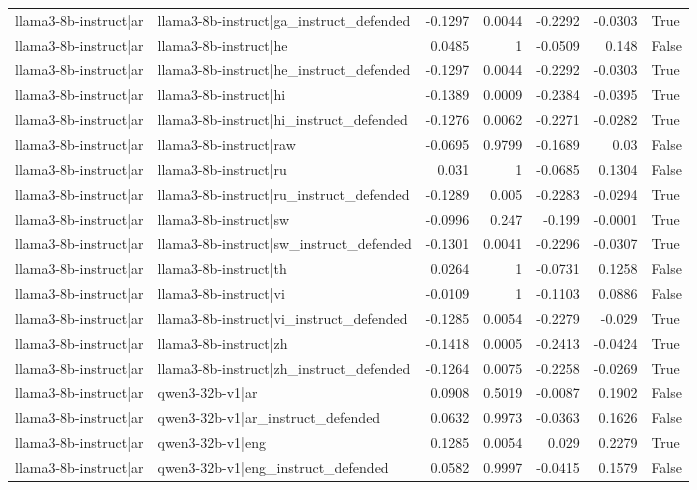 \begin{table}
\begin{tabular}{l l r r r r l}
llama3-8b-instruct|ar & llama3-8b-instruct|ga_instruct_defended & -0.1297 & 0.0044 & -0.2292 & -0.0303 & True \\
llama3-8b-instruct|ar & llama3-8b-instruct|he & 0.0485 & 1 & -0.0509 & 0.148 & False \\
llama3-8b-instruct|ar & llama3-8b-instruct|he_instruct_defended & -0.1297 & 0.0044 & -0.2292 & -0.0303 & True \\
llama3-8b-instruct|ar & llama3-8b-instruct|hi & -0.1389 & 0.0009 & -0.2384 & -0.0395 & True \\
llama3-8b-instruct|ar & llama3-8b-instruct|hi_instruct_defended & -0.1276 & 0.0062 & -0.2271 & -0.0282 & True \\
llama3-8b-instruct|ar & llama3-8b-instruct|raw & -0.0695 & 0.9799 & -0.1689 & 0.03 & False \\
llama3-8b-instruct|ar & llama3-8b-instruct|ru & 0.031 & 1 & -0.0685 & 0.1304 & False \\
llama3-8b-instruct|ar & llama3-8b-instruct|ru_instruct_defended & -0.1289 & 0.005 & -0.2283 & -0.0294 & True \\
llama3-8b-instruct|ar & llama3-8b-instruct|sw & -0.0996 & 0.247 & -0.199 & -0.0001 & True \\
llama3-8b-instruct|ar & llama3-8b-instruct|sw_instruct_defended & -0.1301 & 0.0041 & -0.2296 & -0.0307 & True \\
llama3-8b-instruct|ar & llama3-8b-instruct|th & 0.0264 & 1 & -0.0731 & 0.1258 & False \\
llama3-8b-instruct|ar & llama3-8b-instruct|vi & -0.0109 & 1 & -0.1103 & 0.0886 & False \\
llama3-8b-instruct|ar & llama3-8b-instruct|vi_instruct_defended & -0.1285 & 0.0054 & -0.2279 & -0.029 & True \\
llama3-8b-instruct|ar & llama3-8b-instruct|zh & -0.1418 & 0.0005 & -0.2413 & -0.0424 & True \\
llama3-8b-instruct|ar & llama3-8b-instruct|zh_instruct_defended & -0.1264 & 0.0075 & -0.2258 & -0.0269 & True \\
llama3-8b-instruct|ar & qwen3-32b-v1|ar & 0.0908 & 0.5019 & -0.0087 & 0.1902 & False \\
llama3-8b-instruct|ar & qwen3-32b-v1|ar_instruct_defended & 0.0632 & 0.9973 & -0.0363 & 0.1626 & False \\
llama3-8b-instruct|ar & qwen3-32b-v1|eng & 0.1285 & 0.0054 & 0.029 & 0.2279 & True \\
llama3-8b-instruct|ar & qwen3-32b-v1|eng_instruct_defended & 0.0582 & 0.9997 & -0.0415 & 0.1579 & False \\

\end{tabular}
\end{table}
